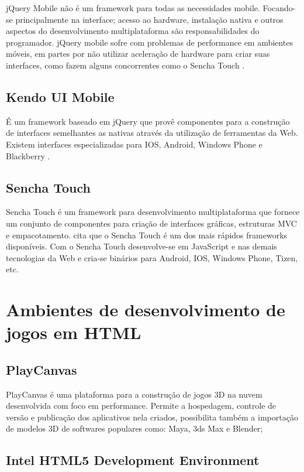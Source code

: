 jQuery Mobile não é um framework para todas as necessidades mobile.
Focando-se principalmente na interface; acesso ao hardware, instalação
nativa e outros aspectos do desenvolvimento multiplataforma
são responsabilidades do programador. jQuery mobile sofre com
problemas de performance em ambientes móveis, em partes por não
utilizar aceleração de hardware para criar suas interfaces,
como fazem alguns concorrentes como o Sencha Touch \autocite[p.
14]{viabilityBusinessApplications}.

\section{Kendo UI Mobile}

É um framework baseado em jQuery que provê componentes para a
construção de interfaces semelhantes as nativas através da
utilização de ferramentas da Web. Existem interfaces especializadas
para IOS, Android, Windows Phone e Blackberry \textsc{\autocite{kendoui}}.

\section{Sencha Touch}

Sencha Touch é um framework para desenvolvimento multiplataforma
que fornece um conjunto de componentes para criação de
interfaces gráficas, estruturas MVC e empacotamento. \citet[p.
14]{viabilityBusinessApplications} cita que o Sencha Touch é um dos
mais rápidos frameworks disponíveis. Com o Sencha Touch desenvolve-se
em JavaScript e nas demais tecnologias da Web e cria-se binários para
Android, IOS, Windows Phone, Tizen, etc.

\chapter{Ambientes de desenvolvimento de jogos em HTML}

\section{PlayCanvas}

PlayCanvas é uma plataforma para a construção de jogos 3D
na nuvem desenvolvida com foco em performance. Permite a hospedagem,
controle de versão e publicação dos aplicativos nela criados,
possibilita também a importação de modelos 3D de softwares populares
como: Maya, 3ds Max e Blender;

\section{Intel HTML5 Development Environment}

